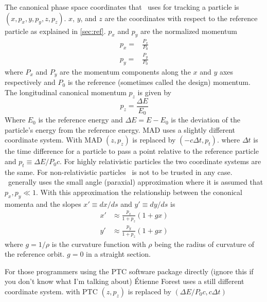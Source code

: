 The canonical phase space coordinates that \bmad\ uses for tracking a
particle is $(x, p_x, y, p_y, z, p_z)$. $x$, $y$, and $z$ are the
coordinates with respect to the reference particle as explained in
\ref{sec:ref}. $p_x$ and $p_y$ are the normalized momentum
\begin{align}
  p_x = &\frac{P_x}{P_0} \\
  p_y = &\frac{P_y}{P_0}
\end{align}
where $P_x$ and $P_y$ are the momentum components along the $x$ and
$y$ axes respectively and $P_0$ is the reference (sometimes called the
design) momentum. The longitudinal canonical momentum $p_z$ is given by
\begin{equation}
  p_z = \frac{\Delta E}{E_0}
\end{equation}
Where $E_0$ is the reference energy and $\Delta E = E - E_0$ is the
deviation of the particle's energy from the reference energy. MAD uses
a slightly different coordinate system. With MAD $(z, p_z)$ is
replaced by $(-c\Delta t, p_t)$. where $\Delta t$ is the time
difference for a particle to pass a point relative to the reference
particle and $p_t \equiv \Delta E / P_0 c$. For highly relativistic
particles the two coordinate systems are the same. For
non-relativistic particles \bmad\ is not to be trusted in any
case. \bmad\ generally uses the small angle (paraxial) approximation
where it is assumed that $p_x, p_y \ll 1$. With this approximation the
relationship between the cononical momenta and the slopes $x' \equiv dx/ds$
and $y' \equiv dy/ds$ is
\begin{align}
  x' &\approx \frac{p_x}{1 + p_z} (1 + g x) \\
  y' &\approx \frac{p_y}{1 + p_z} (1 + g x) 
\end{align}
where $g = 1/\rho$ is the curvature function with $\rho$ being the radius
of curvature of the reference orbit. $g = 0$ in a straight section.

For those programmers using the PTC software package directly (ignore
this if you don't know what I'm talking about) \'Etienne Forest uses a still
different coordinate system. with PTC $(z, p_z)$ is replaced by
$(\Delta E/P_0 c, c \Delta t)$